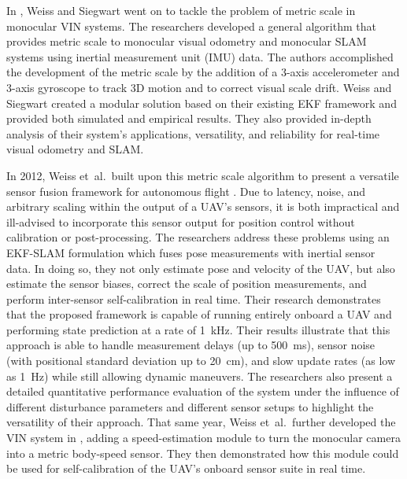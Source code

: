 In \cite{Weiss2011_2}, Weiss and Siegwart went on to tackle the problem of metric scale in monocular VIN systems. The researchers developed a general algorithm that provides metric scale to monocular visual odometry and monocular SLAM systems using inertial measurement unit (IMU) data. The authors accomplished the development of the metric scale by the addition of a 3-axis accelerometer and 3-axis gyroscope to track 3D motion and to correct visual scale drift. Weiss and Siegwart created a modular solution based on their existing EKF framework and provided both simulated and empirical results. They also provided in-depth analysis of their system's applications, versatility, and reliability for real-time visual odometry and SLAM. 

In 2012, Weiss et~al.\ built upon this metric scale algorithm to present a versatile sensor fusion framework for autonomous flight \cite{Weiss2012}. Due to latency, noise, and arbitrary scaling within the output of a UAV's sensors, it is both impractical and ill-advised to incorporate this sensor output for position control without calibration or post-processing. The researchers address these problems using an EKF-SLAM formulation which fuses pose measurements with inertial sensor data. In doing so, they not only estimate pose and velocity of the UAV, but also estimate the sensor biases, correct the scale of position measurements, and perform inter-sensor self-calibration in real time. Their research demonstrates that the proposed framework is capable of running entirely onboard a UAV and performing state prediction at a rate of 1~kHz. Their results illustrate that this approach is able to handle measurement delays (up to 500~ms), sensor noise (with positional standard deviation up to 20~cm), and slow update rates (as low as 1~Hz) while still allowing dynamic maneuvers. The researchers also present a detailed quantitative performance evaluation of the system under the influence of different disturbance parameters and different sensor setups to highlight the versatility of their approach. That same year, Weiss et~al.\ further developed the VIN system in \cite{Weiss2012_2}, adding a speed-estimation module to turn the monocular camera into a metric body-speed sensor. They then demonstrated how this module could be used for self-calibration of the UAV's onboard sensor suite in real time.

